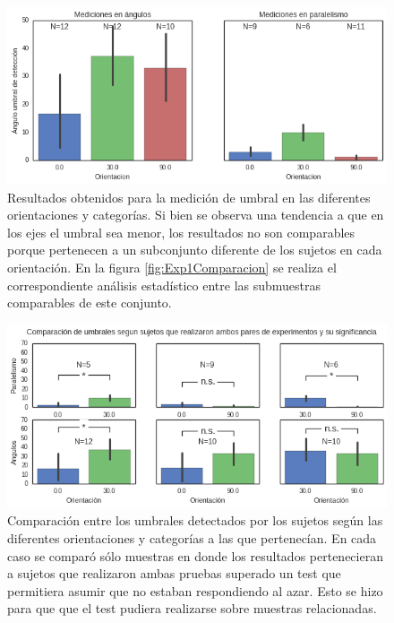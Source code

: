 \documentclass{article}
\begin{document}
    \begin{figure}
        \center
        \includegraphics[width=\textwidth]{Imagenes/Exp1_Resultados.png}
        \caption{Resultados obtenidos para la medición de umbral en las diferentes orientaciones y categorías. Si bien se observa una tendencia a que en los ejes el umbral sea menor, los resultados no son comparables porque pertenecen a un subconjunto diferente de los sujetos en cada orientación. En la figura \ref{fig:Exp1Comparacion} se realiza el correspondiente análisis estadístico entre las submuestras comparables de este conjunto.}
        \label{fig:Exp1Resultados}
    \end{figure}  
	
	\begin{figure}
        \center
        \includegraphics[width=\textwidth]{Imagenes/Exp1_ResultadosDetalle.png}
        \caption{Comparación entre los umbrales detectados por los sujetos según las diferentes orientaciones y categorías a las que pertenecían. En cada caso se comparó sólo muestras en donde los resultados pertenecieran a sujetos que realizaron ambas pruebas superado un test que permitiera asumir que no estaban respondiendo al azar. Esto se hizo para que que el test pudiera realizarse sobre muestras relacionadas.}
        \label{fig:Exp1_ResultadosDetalle}
    \end{figure}  
    
\end{document}

